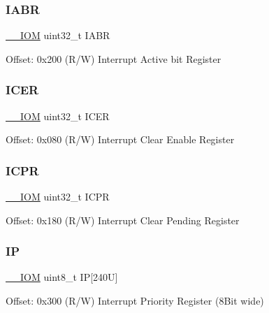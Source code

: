 \subsubsection{\texorpdfstring{I\+A\+BR}{IABR}}
{\footnotesize\ttfamily \mbox{\hyperlink{core__cm4_8h_ab6caba5853a60a17e8e04499b52bf691}{\+\_\+\+\_\+\+I\+OM}} uint32\+\_\+t I\+A\+BR}

Offset\+: 0x200 (R/W) Interrupt Active bit Register \mbox{\label{struct_n_v_i_c___type_ae7aedd01fc75b7b98c6ef887cc21245b}} 
\subsubsection{\texorpdfstring{I\+C\+ER}{ICER}}
{\footnotesize\ttfamily \mbox{\hyperlink{core__cm4_8h_ab6caba5853a60a17e8e04499b52bf691}{\+\_\+\+\_\+\+I\+OM}} uint32\+\_\+t I\+C\+ER}

Offset\+: 0x080 (R/W) Interrupt Clear Enable Register \mbox{\label{struct_n_v_i_c___type_af27404125e8333bfac9a13da10f924ca}} 
\subsubsection{\texorpdfstring{I\+C\+PR}{ICPR}}
{\footnotesize\ttfamily \mbox{\hyperlink{core__cm4_8h_ab6caba5853a60a17e8e04499b52bf691}{\+\_\+\+\_\+\+I\+OM}} uint32\+\_\+t I\+C\+PR}

Offset\+: 0x180 (R/W) Interrupt Clear Pending Register \mbox{\label{struct_n_v_i_c___type_a4fda947a8fd3237a89d43b7d5a1057cb}} 
\subsubsection{\texorpdfstring{IP}{IP}}
{\footnotesize\ttfamily \mbox{\hyperlink{core__cm4_8h_ab6caba5853a60a17e8e04499b52bf691}{\+\_\+\+\_\+\+I\+OM}} uint8\+\_\+t IP\mbox{[}240\+U\mbox{]}}

Offset\+: 0x300 (R/W) Interrupt Priority Register (8\+Bit wide) \mbox{\label{struct_n_v_i_c___type_a5a3763fa8e079c90b6a8e09c0587eef4}} 
